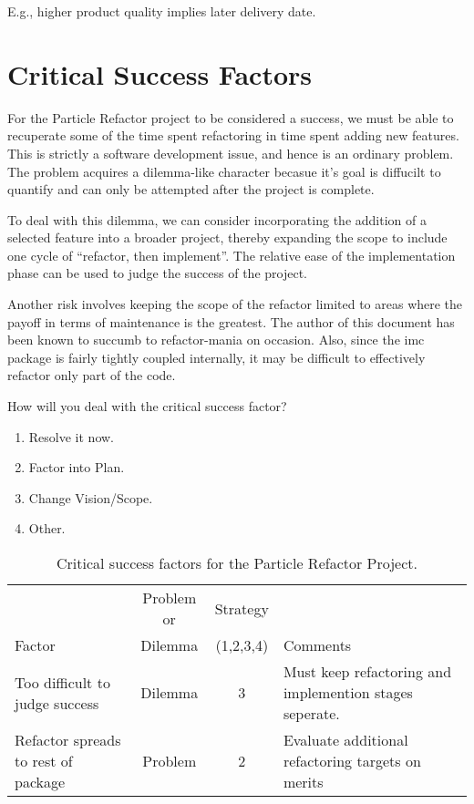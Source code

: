 \documentclass[11pt]{nmemo}
\begin{document}
E.g., higher product quality implies later delivery date.


\newpage
\section*{Critical Success Factors}

For the Particle Refactor project to be considered a success, we must
be able to recuperate some of the time spent refactoring in time spent
adding new features. This is strictly a software development issue,
and hence is an ordinary problem. The problem acquires a dilemma-like
character becasue it's goal is diffucilt to quantify and can only be
attempted after the project is complete.

To deal with this dilemma, we can consider incorporating the addition
of a selected feature into a broader project, thereby expanding the
scope to include one cycle of ``refactor, then implement''. The
relative ease of the implementation phase can be used to judge the
success of the project.

Another risk involves keeping the scope of the refactor limited to
areas where the payoff in terms of maintenance is the greatest. The
author of this document has been known to succumb to refactor-mania on
occasion. Also, since the imc package is fairly tightly coupled
internally, it may be difficult to effectively refactor only part of
the code.

How will you deal with the critical success factor?
\begin{enumerate}
  \item Resolve it now.
  \item Factor into Plan.
  \item Change Vision/Scope.
  \item Other.
\end{enumerate}

\begin{table}[ht]
  \begin{center}
    \caption{Critical success factors for the Particle Refactor Project.}
    \label{tab:critical-success}
    \begin{tabular}{|p{4.5cm}|c|c|p{4.5cm}|} 
    \hline
                       & Problem or & Strategy  &          \\
    Factor             &  Dilemma   & (1,2,3,4) & Comments \\ 
    \hline\hline
    Too difficult to judge success 
    & Dilemma & 3 
    & Must keep refactoring and implemention stages seperate. \\
    Refactor spreads to rest of package
    & Problem & 2
    & Evaluate additional refactoring targets on merits \\
    \hline
    \end{tabular}
  \end{center}
\end{table}
\end{document}
